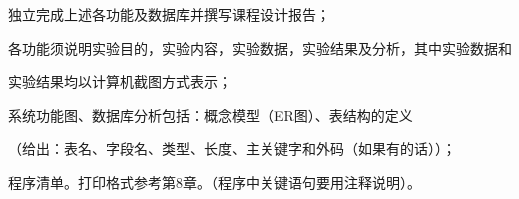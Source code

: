 

            \begin{inparaenum}
                \qquad \item 独立完成上述各功能及数据库并撰写课程设计报告；

                \qquad \item 各功能须说明实验目的，实验内容，实验数据，实验结果及分析，其中实验数据和

                \qquad 实验结果均以计算机截图方式表示；

                \qquad \item 系统功能图、数据库分析包括：概念模型（ER图）、表结构的定义

                \qquad （给出：表名、字段名、类型、长度、主关键字和外码（如果有的话））；

                \qquad \item 程序清单。打印格式参考第8章。（程序中关键语句要用注释说明）。
            \end{inparaenum}